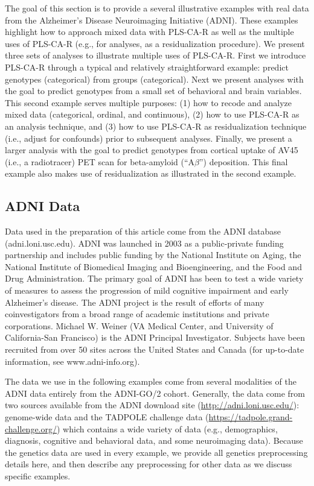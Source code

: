 \documentclass[12pt]{article}
\begin{document}
The goal of this section is to provide a several illustrative examples
with real data from the Alzheimer's Disease Neuroimaging Initiative
(ADNI). These examples highlight how to approach mixed data with
PLS-CA-R as well as the multiple uses of PLS-CA-R (e.g., for analyses,
as a residualization procedure). We present three sets of analyses to
illustrate multiple uses of PLS-CA-R. First we introduce PLS-CA-R
through a typical and relatively straightforward example: predict
genotypes (categorical) from groups (categorical). Next we present
analyses with the goal to predict genotypes from a small set of
behavioral and brain variables. This second example serves multiple
purposes: (1) how to recode and analyze mixed data (categorical,
ordinal, and continuous), (2) how to use PLS-CA-R as an analysis
technique, and (3) how to use PLS-CA-R as residualization technique
(i.e., adjust for confounds) prior to subsequent analyses. Finally, we
present a larger analysis with the goal to predict genotypes from
cortical uptake of AV45 (i.e., a radiotracer) PET scan for beta-amyloid
(``A\(\beta\)'') deposition. This final example also makes use of
residualization as illustrated in the second example.

\hypertarget{adni-data}{%
\subsection{ADNI Data}\label{adni-data}}

\label{section:data}

Data used in the preparation of this article come from the ADNI database
(adni.loni.usc.edu). ADNI was launched in 2003 as a public-private
funding partnership and includes public funding by the National
Institute on Aging, the National Institute of Biomedical Imaging and
Bioengineering, and the Food and Drug Administration. The primary goal
of ADNI has been to test a wide variety of measures to assess the
progression of mild cognitive impairment and early Alzheimer's disease.
The ADNI project is the result of efforts of many coinvestigators from a
broad range of academic institutions and private corporations. Michael
W. Weiner (VA Medical Center, and University of California-San
Francisco) is the ADNI Principal Investigator. Subjects have been
recruited from over 50 sites across the United States and Canada (for
up-to-date information, see www.adni-info.org).

The data we use in the following examples come from several modalities
of the ADNI data entirely from the ADNI-GO/2 cohort. Generally, the data
come from two sources available from the ADNI download site
(\url{http://adni.loni.usc.edu/}): genome-wide data and the TADPOLE
challenge data (\url{https://tadpole.grand-challenge.org/}) which
contains a wide variety of data (e.g., demographics, diagnosis,
cognitive and behavioral data, and some neuroimaging data). Because the
genetics data are used in every example, we provide all genetics
preprocessing details here, and then describe any preprocessing for
other data as we discuss specific examples.
\end{document}
